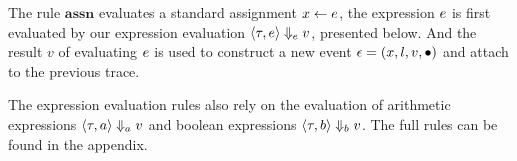 The rule $\textbf{assn}$ evaluates a standard assignment $\mathrel{ x \leftarrow e }$, the expression $e$ is first evaluated by our expression evaluation $\langle \mathtt{\tau}, e \rangle \Downarrow_e v $, presented below. And the result $v$ of evaluating $e$ is used to construct a new event $\mathtt{\epsilon} = (x, l, v,\bullet)$ and attach to the previous trace.  
The expression evaluation rules also rely on the evaluation of arithmetic expressions $\langle \mathtt{\tau},a \rangle \Downarrow_a v $ and boolean expressions $\langle \mathtt{\tau}, b \rangle \Downarrow_b v $. The full rules can be found in the appendix.
